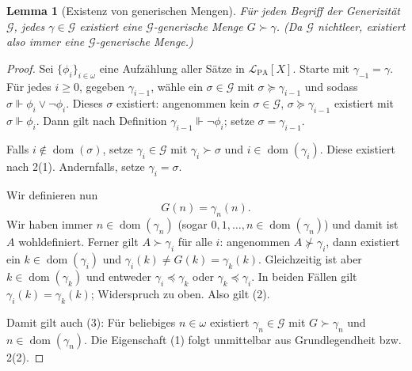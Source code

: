 \documentclass[nofonts]{uebung}
\newtheorem{lemma}[theorem]{Lemma}
\DeclareMathOperator{\dom}{dom}
\begin{document}
\begin{lemma}[Existenz von generischen Mengen]
    Für jeden Begriff der Generizität $\mathcal G$, jedes $\gamma\in\mathcal G$ existiert eine $\mathcal G$-generische Menge $G\succ \gamma$.
    (Da $\mathcal G$ nichtleer, existiert also immer eine $\mathcal G$-generische Menge.)
\end{lemma}
\begin{proof}
    Sei $\{\phi_i\}_{i\in\omega}$ eine Aufzählung aller Sätze in $\mathcal L_{\mathrm{PA}}[X]$. 
    Starte mit $\gamma_{-1}=\gamma$. Für jedes $i\geq 0$, gegeben $\gamma_{i-1}$, wähle ein $\sigma\in\mathcal G$ mit $\sigma\succeq\gamma_{i-1}$ und sodass $\sigma \Vdash \phi_i\lor\neg\phi_i$. Dieses $\sigma$ existiert: angenommen kein $\sigma\in\mathcal G$, $\sigma\succeq\gamma_{i-1}$ existiert mit $\sigma\Vdash \phi_i$. Dann gilt nach Definition $\gamma_{i-1}\Vdash\neg\phi_i$; setze $\sigma=\gamma_{i-1}$.

    Falls $i\not\in\dom(\sigma)$, setze $\gamma_i\in\mathcal G$ mit $\gamma_i\succ\sigma$ und $i\in\dom(\gamma_i)$. Diese existiert nach 2(1).
    Andernfalls, setze $\gamma_i=\sigma$.





    Wir definieren nun
    \[ G(n) = \gamma_n(n). \]
    Wir haben immer $n\in\dom(\gamma_n)$ (sogar $0,1,\dots, n\in\dom(\gamma_n)$) und damit ist $A$ wohldefiniert.
    Ferner gilt $A\succ\gamma_i$ für alle $i$: angenommen $A\not\succ\gamma_i$, dann existiert ein $k\in\dom(\gamma_i)$ und $\gamma_i(k)\neq G(k)=\gamma_k(k)$.
    Gleichzeitig ist aber $k\in\dom(\gamma_k)$ und entweder $\gamma_i\preceq \gamma_k$ oder $\gamma_k\preceq \gamma_i$. In beiden Fällen gilt $\gamma_i(k)=\gamma_k(k)$; Widerspruch zu oben.
    Also gilt (2).

    Damit gilt auch (3): Für beliebiges $n\in\omega$ existiert $\gamma_n\in\mathcal G$ mit $G\succ \gamma_n$ und $n\in\dom(\gamma_n)$.
    Die Eigenschaft (1) folgt unmittelbar aus Grundlegendheit bzw. 2(2).
\end{proof}
\end{document}

